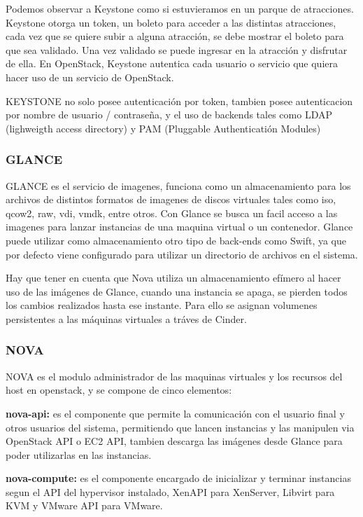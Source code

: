     Podemos observar a Keystone como si estuvieramos en un parque de atracciones. Keystone otorga un token, un boleto para acceder a las distintas atracciones, cada vez que se quiere subir a alguna atracción, se debe mostrar el boleto para que sea validado. Una vez validado se puede ingresar en la atracción y disfrutar de ella. En OpenStack, Keystone autentica cada usuario o servicio que quiera hacer uso de un servicio de OpenStack.
    
    KEYSTONE no solo posee autenticación por token, tambien posee autenticacion por nombre de usuario / contraseña, y  el uso de backends tales como LDAP (lighweigth access directory) y PAM (Pluggable Authenticatión Modules)
    
    \subsubsection{GLANCE}
    
    GLANCE es el servicio de imagenes, funciona como un almacenamiento para los archivos de distintos formatos de imagenes de discos virtuales tales como iso, qcow2, raw, vdi, vmdk, entre otros. Con Glance se busca un facil acceso a las imagenes para lanzar instancias de una maquina virtual o un contenedor. Glance puede utilizar como almacenamiento otro tipo de back-ends como Swift, ya que por defecto viene configurado para utilizar un directorio de archivos en el sistema.
    
    Hay que tener en cuenta que Nova utiliza un almacenamiento efímero al hacer uso de las imágenes de Glance, cuando una instancia se apaga, se pierden todos los cambios realizados hasta ese instante. Para ello se asignan volumenes persistentes a las máquinas virtuales a tráves de Cinder.
    
    \subsubsection{NOVA}
    
    NOVA es el modulo administrador de las maquinas virtuales y los recursos del host en openstack, y se compone de cinco elementos:
    
    \textbf{nova-api:} es el componente que permite la comunicación con el usuario final y otros usuarios del sistema, permitiendo que lancen instancias y las manipulen via OpenStack API o EC2 API, tambien descarga las imágenes desde Glance para poder utilizarlas en las instancias.
    
    \textbf{nova-compute:} es el componente encargado de inicializar y terminar instancias segun el API del hypervisor instalado, XenAPI para XenServer, Libvirt para KVM y VMware API para VMware.
   
